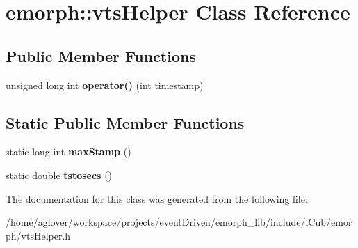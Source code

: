 \hypertarget{classemorph_1_1vtsHelper}{\section{emorph\-:\-:vts\-Helper Class Reference}
\label{classemorph_1_1vtsHelper}
}
\subsection*{Public Member Functions}
\begin{DoxyCompactItemize}
\item 
\hypertarget{classemorph_1_1vtsHelper_afc51549e5a47ec249359360980964361}{unsigned long int {\bfseries operator()} (int timestamp)}\label{classemorph_1_1vtsHelper_afc51549e5a47ec249359360980964361}

\end{DoxyCompactItemize}
\subsection*{Static Public Member Functions}
\begin{DoxyCompactItemize}
\item 
\hypertarget{classemorph_1_1vtsHelper_a272802b997c7957e35bca9171dd9b67f}{static long int {\bfseries max\-Stamp} ()}\label{classemorph_1_1vtsHelper_a272802b997c7957e35bca9171dd9b67f}

\item 
\hypertarget{classemorph_1_1vtsHelper_afff75520a8c7147c9d96b988ffd1c457}{static double {\bfseries tstosecs} ()}\label{classemorph_1_1vtsHelper_afff75520a8c7147c9d96b988ffd1c457}

\end{DoxyCompactItemize}


The documentation for this class was generated from the following file\-:\begin{DoxyCompactItemize}
\item 
/home/aglover/workspace/projects/event\-Driven/emorph\-\_\-lib/include/i\-Cub/emorph/vts\-Helper.\-h\end{DoxyCompactItemize}
